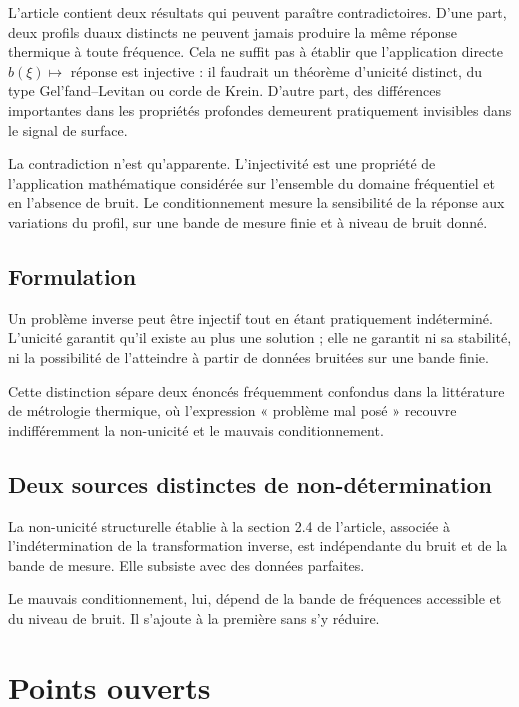 \documentclass[11pt,a4paper]{article}
\begin{document}
L'article contient deux résultats qui peuvent paraître contradictoires. D'une part, deux profils duaux
distincts ne peuvent jamais produire la même réponse thermique à toute fréquence. Cela ne suffit pas
à établir que l'application directe $b(\xi)\mapsto$ réponse est injective : il faudrait un théorème
d'unicité distinct, du type Gel'fand--Levitan ou corde de Krein. D'autre part, des différences importantes dans les propriétés profondes
demeurent pratiquement invisibles dans le signal de surface.

La contradiction n'est qu'apparente. L'injectivité est une propriété de l'application mathématique
considérée sur l'ensemble du domaine fréquentiel et en l'absence de bruit. Le conditionnement mesure la
sensibilité de la réponse aux variations du profil, sur une bande de mesure finie et à niveau de bruit
donné.

\subsection{Formulation}

Un problème inverse peut être injectif tout en étant pratiquement indéterminé. L'unicité garantit qu'il
existe au plus une solution ; elle ne garantit ni sa stabilité, ni la possibilité de l'atteindre à
partir de données bruitées sur une bande finie.

Cette distinction sépare deux énoncés fréquemment confondus dans la littérature de métrologie
thermique, où l'expression « problème mal posé » recouvre indifféremment la non-unicité et le mauvais
conditionnement.

\subsection{Deux sources distinctes de non-détermination}

La non-unicité structurelle établie à la section 2.4 de l'article, associée à l'indétermination de la
transformation inverse, est indépendante du bruit et de la bande de mesure. Elle subsiste avec des
données parfaites.

Le mauvais conditionnement, lui, dépend de la bande de fréquences accessible et du niveau de bruit. Il
s'ajoute à la première sans s'y réduire.

\section{Points ouverts}
\end{document}
